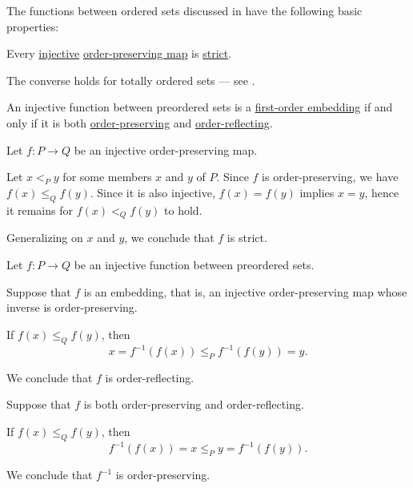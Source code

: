 \begin{proposition}\label{thm:def:order_function}
  The functions between ordered sets discussed in  have the following basic properties:
  \begin{thmenum}
     Every \hyperref[def:function_invertibility/injective]{injective} \hyperref[def:order_function/preserving]{order-preserving map} is \hyperref[def:order_function/preserving]{strict}.

    The converse holds for totally ordered sets --- see .

     An injective function between preordered sets is a \hyperref[def:first_order_embedding]{first-order embedding} if and only if it is both \hyperref[def:order_function/preserving]{order-preserving} and \hyperref[def:order_function/preserving]{order-reflecting}.
  \end{thmenum}
\end{proposition}
\begin{defproof}
   Let \( f: P \to Q \) be an injective order-preserving map.

  Let \( x <_P y \) for some members \( x \) and \( y \) of \( P \). Since \( f \) is order-preserving, we have \( f(x) \leq_Q f(y) \). Since it is also injective, \( f(x) = f(y) \) implies \( x = y \), hence it remains for \( f(x) <_Q f(y) \) to hold.

  Generalizing on \( x \) and \( y \), we conclude that \( f \) is strict.

   Let \( f: P \to Q \) be an injective function between preordered sets.

  \SufficiencySubProof* Suppose that \( f \) is an embedding, that is, an injective order-preserving map whose inverse is order-preserving.

  If \( f(x) \leq_Q f(y) \), then
  \begin{equation*}
    x = f^{-1}(f(x)) \leq_P f^{-1}(f(y)) = y.
  \end{equation*}

  We conclude that \( f \) is order-reflecting.

  \NecessitySubProof* Suppose that \( f \) is both order-preserving and order-reflecting.

  If \( f(x) \leq_Q f(y) \), then
  \begin{equation*}
    f^{-1}(f(x)) = x \leq_P y = f^{-1}(f(y)).
  \end{equation*}

  We conclude that \( f^{-1} \) is order-preserving.
\end{defproof}
